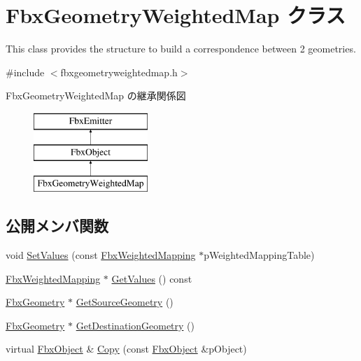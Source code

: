 \hypertarget{class_fbx_geometry_weighted_map}{}\section{Fbx\+Geometry\+Weighted\+Map クラス}
\label{class_fbx_geometry_weighted_map}


This class provides the structure to build a correspondence between 2 geometries.  




{\ttfamily \#include $<$fbxgeometryweightedmap.\+h$>$}

Fbx\+Geometry\+Weighted\+Map の継承関係図\begin{figure}[H]
\begin{center}
\leavevmode
\includegraphics[height=3.000000cm]{class_fbx_geometry_weighted_map}
\end{center}
\end{figure}
\subsection*{公開メンバ関数}
\begin{DoxyCompactItemize}
\item 
void \hyperlink{class_fbx_geometry_weighted_map_a42bb06040581c024f72d39e6a4318f4f}{Set\+Values} (const \hyperlink{class_fbx_weighted_mapping}{Fbx\+Weighted\+Mapping} $\ast$p\+Weighted\+Mapping\+Table)
\item 
\hyperlink{class_fbx_weighted_mapping}{Fbx\+Weighted\+Mapping} $\ast$ \hyperlink{class_fbx_geometry_weighted_map_a55d4ce89b77af065e73c32b9e5bd17e5}{Get\+Values} () const
\item 
\hyperlink{class_fbx_geometry}{Fbx\+Geometry} $\ast$ \hyperlink{class_fbx_geometry_weighted_map_a5177720946120c17fe2003a979256e00}{Get\+Source\+Geometry} ()
\item 
\hyperlink{class_fbx_geometry}{Fbx\+Geometry} $\ast$ \hyperlink{class_fbx_geometry_weighted_map_ac0d7b29146fd71ceed30e13bf99f2656}{Get\+Destination\+Geometry} ()
\item 
virtual \hyperlink{class_fbx_object}{Fbx\+Object} \& \hyperlink{class_fbx_geometry_weighted_map_aa0310025b01de1d69b9f313a886df3c0}{Copy} (const \hyperlink{class_fbx_object}{Fbx\+Object} \&p\+Object)
\end{DoxyCompactItemize}
